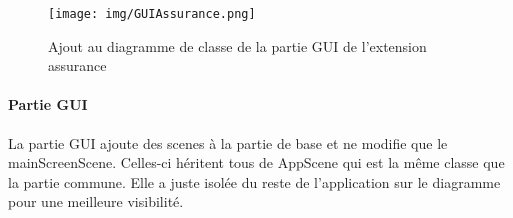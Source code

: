     \begin{figure}[ht]
    \centering
    \texttt{[image: img/GUIAssurance.png]}
    \caption{Ajout au diagramme de classe de la partie GUI de l'extension assurance}
    \label{fig3}
    \end{figure}
    
    \paragraph{Partie GUI} La partie GUI ajoute des scenes à la partie de base et ne modifie que le mainScreenScene. Celles-ci héritent tous de AppScene qui est la même classe que la partie commune. Elle a juste isolée du reste de l’application sur le diagramme pour une meilleure visibilité.
    